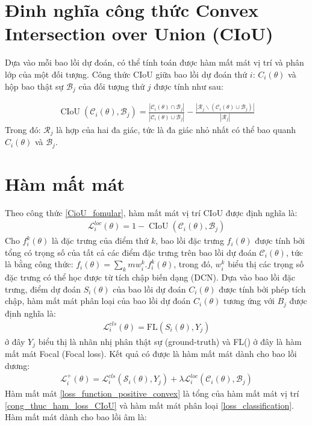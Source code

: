 \documentclass[12pt,a4paper,openany,oneside]{report}
\begin{document}
\section{Đinh nghĩa công thức Convex Intersection over Union (CIoU)}
Dựa vào mỗi bao lồi dự đoán, có thể tính toán được hàm mất mát vị trí và phân lớp của một đối tượng. Công thức CIoU giữa bao lồi dự đoán thứ $i$:  $C_i(\theta)$ và hộp bao thật sự $\mathcal{B}_j$ của đối tượng thứ $j$ được tính như sau:

\begin{align} \label{CioU_fomular}
	\operatorname{CIoU}\left(\mathcal{C}_i(\theta), \mathcal{B}_j\right)=\frac{\left|\mathcal{C}_i(\theta) \cap \mathcal{B}_j\right|}{\left|\mathcal{C}_i(\theta) \cup \mathcal{B}_j\right|}-\frac{\left|\mathcal{R}_j \backslash\left(\mathcal{C}_i(\theta) \cup \mathcal{B}_j\right)\right|}{\left|\mathcal{R}_j\right|}
\end{align}
Trong đó: $\mathcal{R}_j$ là hợp của hai đa giác, tức là đa giác nhỏ nhất có thể bao quanh  $C_i(\theta)$ và $\mathcal{B}_j$.
\section{Hàm mất mát}
Theo công thức \ref{CioU_fomular}, hàm mất mát vị trí CIoU được định nghĩa là:
\begin{align} \label{cong_thuc_ham_loss_CIoU}
	\mathcal{L}_i^{l o c}(\theta)=1-\operatorname{CIoU}\left(\mathcal{C}_i(\theta), \mathcal{B}_j\right)
\end{align}
Cho $f_i^{k}(\theta)$ là đặc trưng của điểm thứ $k$, bao lồi đặc trưng $f_i(\theta)$ được tính bởi tổng có trọng số của tất cả các điểm đặc trưng trên bao lồi dự đoán $\mathcal{C}_i(\theta)$, tức là bằng công thức: $f_i(\theta) = \sum_{k}m w_i^k.f_i^k(\theta)$, trong đó, $w_i^k$ biểu thị các trọng số đặc trưng có thể học được từ tích chập biến dạng (DCN). Dựa vào bao lồi đặc trưng, điểm dự đoán $S_i(\theta)$ của bao lồi dự đoán $C_i(\theta)$ được tính bởi phép tích chập, hàm mất mát phân loại của bao lồi dự đoán $C_i(\theta)$ tương ứng với $B_j$ được định nghĩa là:
\begin{align} \label{loss_classification}
	\mathcal{L}_i^{c l s}(\theta)=\mathrm{FL}\left(S_i(\theta), Y_j\right)
\end{align}
ở đây $Y_j$ biểu thị là nhãn nhị phân thật sự (ground-truth) và FL() ở đây là hàm mất mát Focal (Focal loss). Kết quả có được là hàm mất mát dành cho bao lồi dương: 
\begin{align} \label{loss_function_positive_convex}
	\mathcal{L}_i^{+}(\theta)=\mathcal{L}_i^{c l s}\left(\mathcal{S}_i(\theta), Y_j\right)+\lambda \mathcal{L}_i^{l o c}\left(\mathcal{C}_i(\theta), \mathcal{B}_j\right)
\end{align}
Hàm mất mát \ref{loss_function_positive_convex} là tổng của hàm mất mát vị trí \ref{cong_thuc_ham_loss_CIoU} và hàm mất mát phân loại \ref{loss_classification}.
Hàm mất mát dành cho bao lồi âm là:
\end{document}
